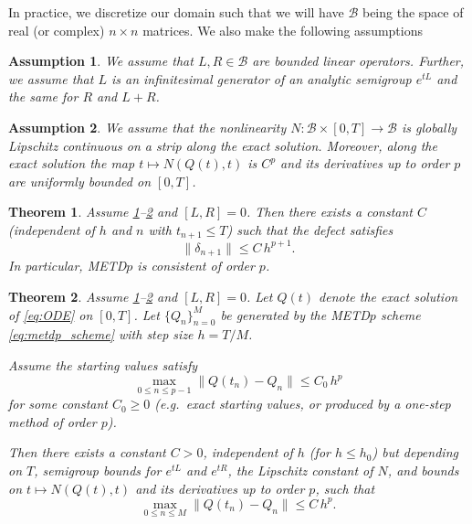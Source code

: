 \documentclass[10pt,a4paper]{amsart}
\newtheorem{thm}{Theorem}
\newtheorem{asp}{Assumption}
\begin{document}
In practice, we discretize our domain such that we will have $\mathcal{B}$ being the space of real (or complex) $n \times n$ matrices. We also make the following assumptions

\begin{asp}
    \label{asm:ass1}
    We assume that $L,R\in \mathcal B$ are bounded linear operators. Further, we assume that $L$ is an infinitesimal generator of an analytic semigroup $e^{tL}$ and the same for $R$ and $L+R$.
\end{asp}

\begin{asp}
    \label{asm:ass2}
    We assume that the nonlinearity $N : \mathcal{B} \times [0,T] \to \mathcal{B}$ is globally Lipschitz continuous on a strip along the exact solution. Moreover, along the exact solution the map $t\mapsto N(Q(t),t)$ is $C^{p}$ and its derivatives up to order $p$ are uniformly bounded on $[0,T]$.
\end{asp}

\begin{thm}
\label{thm:metdp_local}
Assume \ref{asm:ass1}--\ref{asm:ass2} and $[L,R]=0$. Then there exists a constant $C$ (independent of $h$ and $n$ with $t_{n+1}\le T$) such that the defect satisfies
\begin{equation*}
\|\delta_{n+1}\|\le C\,h^{p+1}.
\end{equation*}
In particular, METD$p$ is consistent of order $p$.
\end{thm}

\begin{thm}
\label{thm:metdp_global}
Assume \ref{asm:ass1}--\ref{asm:ass2} and $[L,R]=0$.
Let $Q(t)$ denote the exact solution of \eqref{eq:ODE} on $[0,T]$.
Let $\{Q_n\}_{n=0}^{M}$ be generated by the METD$p$ scheme \eqref{eq:metdp_scheme} with step size $h=T/M$.

Assume the starting values satisfy
\begin{equation}\label{eq:startup_assumption}
\max_{0\le n\le p-1}\|Q(t_n)-Q_n\|\le C_0\,h^p
\end{equation}
for some constant $C_0\ge 0$ (e.g.\ exact starting values, or produced by a one-step method of order $p$).

Then there exists a constant $C>0$, independent of $h$ (for $h\le h_0$) but depending on $T$, semigroup bounds for $e^{tL}$ and $e^{tR}$, the Lipschitz constant of $N$, and bounds on $t\mapsto N(Q(t),t)$ and its derivatives up to order $p$, such that
\begin{equation}\label{eq:global_error}
\max_{0\le n\le M}\|Q(t_n)-Q_n\|\le C\,h^{p}.
\end{equation}
\end{thm}
\end{document}
